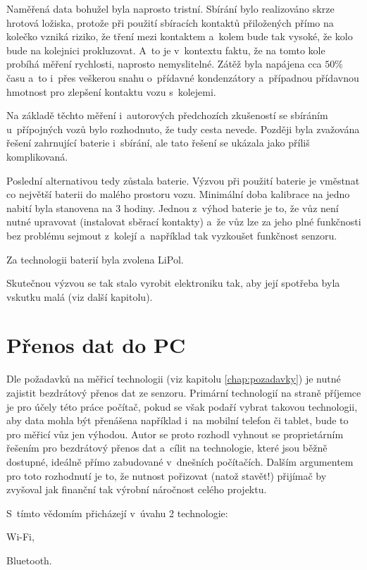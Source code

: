 Naměřená data bohužel byla naprosto tristní. Sbírání bylo realizováno skrze
hrotová ložiska, protože při použití sbíracích kontaktů přiložených přímo na
kolečko vzniká riziko, že tření mezi kontaktem a~kolem bude tak vysoké, že kolo
bude na kolejnici prokluzovat. A~to je v~kontextu faktu, že na tomto kole
probíhá měření rychlosti, naprosto nemyslitelné. Zátěž byla napájena cca $50 \%$
času a~to i~přes veškerou snahu o~přídavné kondenzátory a~případnou přídavnou
hmotnost pro zlepšení kontaktu vozu s~kolejemi.

Na základě těchto měření i~autorových předchozích zkušeností se sbíráním
u~přípojných vozů bylo rozhodnuto, že tudy cesta nevede. Později byla zvažována
řešení zahrnující baterie i~sbírání, ale tato řešení se ukázala jako příliš
komplikovaná.

Poslední alternativou tedy zůstala baterie. Výzvou při použití baterie je
vměstnat co největší baterii do malého prostoru vozu. Minimální doba kalibrace
na jedno nabití byla stanovena na 3 hodiny. Jednou z~výhod baterie je to, že
vůz není nutné upravovat (instalovat sběrací kontakty) a~že vůz lze za jeho
plné funkčnosti bez problému sejmout z~kolejí a~například tak vyzkoušet
funkčnost senzoru.

Za technologii baterií byla zvolena LiPol.

Skutečnou výzvou se tak stalo vyrobit elektroniku tak, aby její spotřeba byla
vskutku malá (viz další kapitolu).

\section{Přenos dat do PC}
\label{sec:wsm-prenos-pc}

Dle požadavků na měřicí technologii (viz kapitolu \ref{chap:pozadavky}) je
nutné zajistit bezdrátový přenos dat ze senzoru. Primární technologií na straně
příjemce je pro účely této práce počítač, pokud se však podaří vybrat takovou
technologii, aby data mohla být přenášena například i~na mobilní telefon či
tablet, bude to pro měřicí vůz jen výhodou. Autor se proto rozhodl vyhnout se
proprietárním řešením pro bezdrátový přenos dat a~cílit na technologie, které
jsou běžně dostupné, ideálně přímo zabudované v~dnešních počítačích. Dalším
argumentem pro toto rozhodnutí je to, že nutnost pořizovat (natož stavět!)
přijímač by zvyšoval jak finanční tak výrobní náročnost celého projektu.

S~tímto vědomím přicházejí v~úvahu 2 technologie:

\begin{compactenum}
\item Wi-Fi,
\item Bluetooth.
\end{compactenum}

